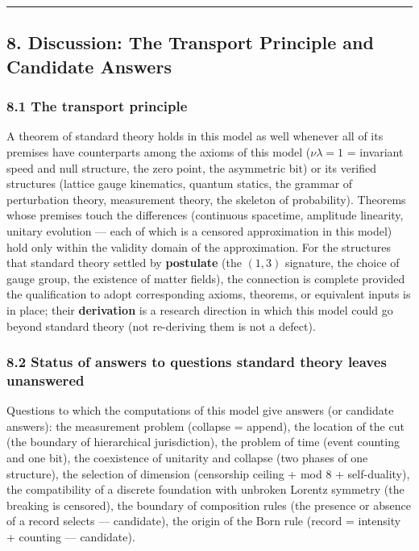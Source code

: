 \documentclass[
]{ltjsarticle}
\begin{document}
\begin{center}\rule{0.5\linewidth}{0.5pt}\end{center}

\subsection{8. Discussion: The Transport Principle and Candidate
Answers}\label{discussion-the-transport-principle-and-candidate-answers}

\subsubsection{8.1 The transport
principle}\label{the-transport-principle}

A theorem of standard theory holds in this model as well whenever all of
its premises have counterparts among the axioms of this model
(\(\nu\lambda=1\) = invariant speed and null structure, the zero point,
the asymmetric bit) or its verified structures (lattice gauge
kinematics, quantum statics, the grammar of perturbation theory,
measurement theory, the skeleton of probability). Theorems whose
premises touch the differences (continuous spacetime, amplitude
linearity, unitary evolution --- each of which is a censored
approximation in this model) hold only within the validity domain of the
approximation. For the structures that standard theory settled by
\textbf{postulate} (the \((1,3)\) signature, the choice of gauge group,
the existence of matter fields), the connection is complete provided the
qualification to adopt corresponding axioms, theorems, or equivalent
inputs is in place; their \textbf{derivation} is a research direction in
which this model could go beyond standard theory (not re-deriving them
is not a defect).

\subsubsection{8.2 Status of answers to questions standard theory leaves
unanswered}\label{status-of-answers-to-questions-standard-theory-leaves-unanswered}

Questions to which the computations of this model give answers (or
candidate answers): the measurement problem (collapse = append), the
location of the cut (the boundary of hierarchical jurisdiction), the
problem of time (event counting and one bit), the coexistence of
unitarity and collapse (two phases of one structure), the selection of
dimension (censorship ceiling + mod 8 + self-duality), the compatibility
of a discrete foundation with unbroken Lorentz symmetry (the breaking is
censored), the boundary of composition rules (the presence or absence of
a record selects --- candidate), the origin of the Born rule (record =
intensity + counting --- candidate).
\end{document}
